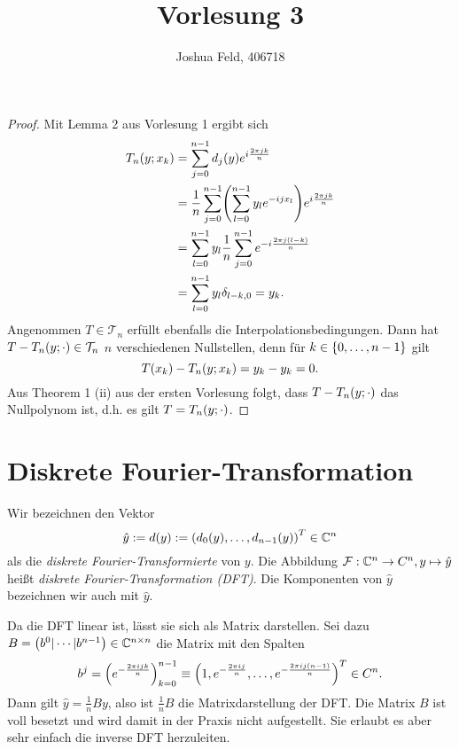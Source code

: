 \documentclass{lecture}
\institute{Applied and Computational Mathematics}
\title{Vorlesung 3}
\author{Joshua Feld, 406718}
\begin{document}
    \maketitle

    \begin{proof}
        Mit Lemma 2 aus Vorlesung 1 ergibt sich
        \begin{align*}
            T_n\parentheses*{y; x_k} &= \sum_{j = 0}^{n - 1}d_j\parentheses*{y}e^{i\frac{2\pi jk}n}\\
            &= \frac{1}{n}\sum_{j = 0}^{n - 1}\parentheses*{\sum_{l = 0}^{n - 1}y_l e^{-ijx_l}}e^{i\frac{2\pi jk}{n}}\\
            &= \sum_{l = 0}^{n - 1}y_l\frac{1}{n}\sum_{j = 0}^{n - 1}e^{-i\frac{2\pi j\parentheses*{l - k}}{n}}\\
            &= \sum_{l = 0}^{n - 1}y_l\delta_{l - k, 0} = y_k.
        \end{align*}
        Angenommen \(T \in \mathcal{T}_n\) erfüllt ebenfalls die Interpolationsbedingungen.
        Dann hat \(T - T_n\parentheses*{y; \cdot} \in \mathcal{T}_n\) \(n\) verschiedenen Nullstellen, denn für \(k \in \braces*{0, \ldots, n - 1}\) gilt
        \[
            T\parentheses*{x_k} - T_n\parentheses*{y; x_k} = y_k - y_k = 0.
        \]
        Aus Theorem 1 (ii) aus der ersten Vorlesung folgt, dass \(T - T_n\parentheses*{y; \cdot}\) das Nullpolynom ist, d.h. es gilt \(T = T_n\parentheses*{y; \cdot}\).
    \end{proof}


    \section*{Diskrete Fourier-Transformation}

    \begin{definition}
        Wir bezeichnen den Vektor
        \[
            \hat{y} := d\parentheses*{y} := \parentheses*{d_0\parentheses*{y}, \ldots, d_{n - 1}\parentheses*{y}}^T \in \C^n
        \]
        als die \emph{diskrete Fourier-Transformierte} von \(y\).
        Die Abbildung \(\mathcal{F}: \C^n \to C^n, y \mapsto \hat{y}\) heißt \emph{diskrete Fourier-Transformation (DFT)}.
        Die Komponenten von \(\hat{y}\) bezeichnen wir auch mit \(\hat{y}\).
    \end{definition}

    \begin{remark}
        Da die DFT linear ist, lässt sie sich als Matrix darstellen.
        Sei dazu \(B = \parentheses*{b^0 | \cdots | b^{n - 1}} \in \C^{n \times n}\) die Matrix mit den Spalten
        \[
            b^j = \parentheses*{e^{-\frac{2\pi ijk}{n}}}_{k = 0}^{n - 1} \equiv \parentheses*{1, e^{-\frac{2\pi ij}{n}}, \ldots, e^{-\frac{2\pi ij\parentheses*{n - 1}}{n}}}^T \in C^n.
        \]
        Dann gilt \(\hat{y} = \frac{1}{n}By\), also ist \(\frac{1}{n}B\) die Matrixdarstellung der DFT.
        Die Matrix \(B\) ist voll besetzt und wird damit in der Praxis nicht aufgestellt.
        Sie erlaubt es aber sehr einfach die inverse DFT herzuleiten.
    \end{remark}
\end{document}
